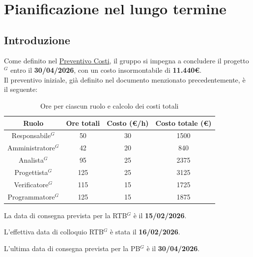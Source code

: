 \section{Pianificazione nel lungo termine}

\subsection{Introduzione}
Come definito nel \href{https://nullpointersgroup.github.io/Documentazione/output/Candidatura/Preventivo_Costi.pdf}{Preventivo Costi}, il gruppo si impegna a concludere il progetto$^G$ entro il \textbf{30/04/2026}, con un costo insormontabile di \textbf{11.440€}.\\
Il preventivo iniziale, già definito nel documento menzionato precedentemente, è il seguente:\\
\begin{table}[h!]
	\centering
	\begin{tabular}{|c|c|c|c|}
		\hline
		\rowcolor{gray!25}
		Ruolo & Ore totali & Costo (€/h) & Costo totale (€) \\ \hline
		Responsabile$^G$ & 50 & 30 & 1500 \\ \hline
		Amministratore$^G$ & 42 & 20 & 840 \\ \hline
		Analista$^G$ & 95 & 25 & 2375 \\ \hline
		Progettista$^G$ & 125 & 25 & 3125 \\ \hline
		Verificatore$^G$ & 115 & 15 & 1725 \\ \hline
		Programmatore$^G$ & 125 & 15 & 1875 \\ \hline
	\end{tabular}
	\caption{Ore per ciascun ruolo e calcolo dei costi totali}
\end{table}

La data di consegna prevista per la RTB$^G$ è il \textbf{15/02/2026}.

L'effettiva data di colloquio RTB$^G$ è stata il \textbf{16/02/2026}.

L'ultima data di consegna prevista per la PB$^G$ è il \textbf{30/04/2026}.

\newpage

